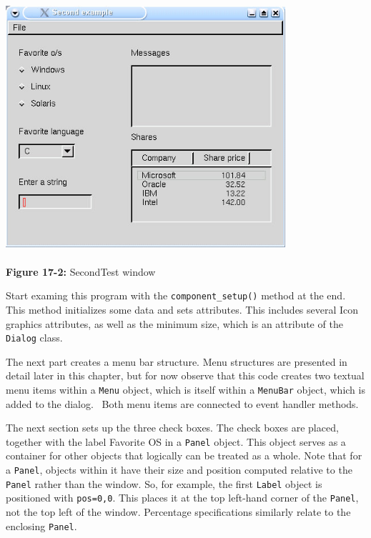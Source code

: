 \begin{center}
\includegraphics[width=4.0756in,height=3.6465in]{ub-img/ub-img51.jpg}
\end{center}

{\sffamily\bfseries Figure 17-2:}
{\sffamily SecondTest window}

\bigskip

Start examing this program with the \texttt{component\_setup()}
method at the end. This method initializes some data and
sets attributes. This includes several Icon graphics attributes,
as well as the minimum size, which is an attribute of the
\texttt{Dialog} class.

The next part creates a menu bar structure.
Menu structures are presented in detail later in this chapter, but for
now observe that this code creates two textual menu items within a
\texttt{Menu} object, which is itself within a \texttt{MenuBar} object,
which is added to the dialog. \ Both menu items are connected to event
handler methods.

The next section sets up the three check boxes. The
check boxes are placed, together with the label {\textquotedbl}Favorite
OS{\textquotedbl} in a \texttt{Panel} object. This object
serves as a container for other objects that logically can be treated
as a whole. Note that for a \texttt{Panel},
objects within it have their size and position computed relative
to the \texttt{Panel} rather than the window. So, for example, the
first \texttt{Label} object is positioned with
\texttt{{\textquotedbl}pos=0,0{\textquotedbl}}. This places it at the
top left-hand corner of the \texttt{Panel}, not the top left of the
window. Percentage specifications similarly relate to the enclosing
\texttt{Panel}.

